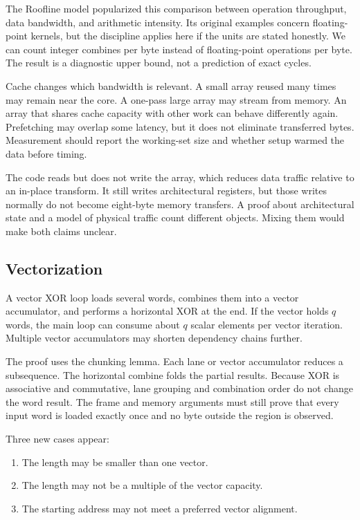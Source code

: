 The Roofline model popularized this comparison between operation throughput,
data bandwidth, and arithmetic intensity. \autocite{williams2009roofline} Its
original examples concern floating-point kernels, but the discipline applies
here if the units are stated honestly. We can count integer combines per byte
instead of floating-point operations per byte. The result is a diagnostic
upper bound, not a prediction of exact cycles.

Cache changes which bandwidth is relevant. A small array reused many times may
remain near the core. A one-pass large array may stream from memory. An array
that shares cache capacity with other work can behave differently again.
Prefetching may overlap some latency, but it does not eliminate transferred
bytes. Measurement should report the working-set size and whether setup warmed
the data before timing.

The code reads but does not write the array, which reduces data traffic
relative to an in-place transform. It still writes architectural registers,
but those writes normally do not become eight-byte memory transfers. A proof
about architectural state and a model of physical traffic count different
objects. Mixing them would make both claims unclear.

\subsection{Vectorization}

A vector XOR loop loads several words, combines them into a vector
accumulator, and performs a horizontal XOR at the end. If the vector holds
\(q\) words, the main loop can consume about \(q\) scalar elements per vector
iteration. Multiple vector accumulators may shorten dependency chains further.

The proof uses the chunking lemma. Each lane or vector accumulator reduces a
subsequence. The horizontal combine folds the partial results. Because XOR is
associative and commutative, lane grouping and combination order do not change
the word result. The frame and memory arguments must still prove that every
input word is loaded exactly once and no byte outside the region is observed.

Three new cases appear:

\begin{enumerate}
\item The length may be smaller than one vector.
\item The length may not be a multiple of the vector capacity.
\item The starting address may not meet a preferred vector alignment.
\end{enumerate}

